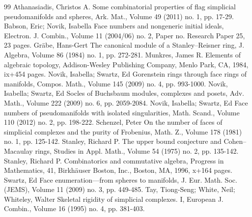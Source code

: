 \documentclass[10pt]{amsart}
\theoremstyle{definition}
\begin{document}
\begin{thebibliography}{99}
 Athanasiadis, Christos A. Some combinatorial properties of flag simplicial pseudomanifolds and spheres, Ark. Mat., Volume 49 (2011) no. 1, pp. 17-29.
 Babson, Eric; Novik, Isabella Face numbers and nongeneric initial ideals, Electron. J. Combin., Volume 11 (2004/06) no. 2, Paper no. Research Paper 25, 23 pages.
 Gräbe, Hans-Gert The canonical module of a Stanley–Reisner ring, J. Algebra, Volume 86 (1984) no. 1, pp. 272-281.
 Munkres, James R. Elements of algebraic topology, Addison-Wesley Publishing Company, Menlo Park, CA, 1984, ix+454 pages.
 Novik, Isabella; Swartz, Ed Gorenstein rings through face rings of manifolds, Compos. Math., Volume 145 (2009) no. 4, pp. 993-1000.
 Novik, Isabella; Swartz, Ed Socles of Buchsbaum modules, complexes and posets, Adv. Math., Volume 222 (2009) no. 6, pp. 2059-2084.
 Novik, Isabella; Swartz, Ed Face numbers of pseudomanifolds with isolated singularities, Math. Scand., Volume 110 (2012) no. 2, pp. 198-222.
 Schenzel, Peter On the number of faces of simplicial complexes and the purity of Frobenius, Math. Z., Volume 178 (1981) no. 1, pp. 125-142.
 Stanley, Richard P. The upper bound conjecture and Cohen–Macaulay rings, Studies in Appl. Math., Volume 54 (1975) no. 2, pp. 135-142.
 Stanley, Richard P. Combinatorics and commutative algebra, Progress in Mathematics, 41, Birkhäuser Boston, Inc., Boston, MA, 1996, x+164 pages.
 Swartz, Ed Face enumeration—from spheres to manifolds, J. Eur. Math. Soc. (JEMS), Volume 11 (2009) no. 3, pp. 449-485.
 Tay, Tiong-Seng; White, Neil; Whiteley, Walter Skeletal rigidity of simplicial complexes. I, European J. Combin., Volume 16 (1995) no. 4, pp. 381-403.
\end{thebibliography}
\end{document}
